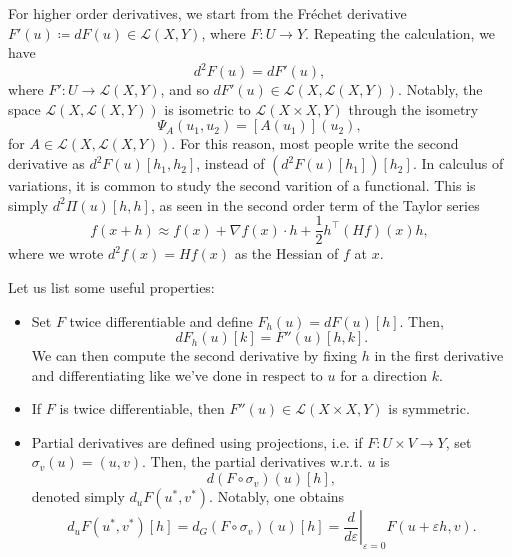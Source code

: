 For higher order derivatives, we start from the Fréchet derivative $F'(u) \coloneqq dF(u)\in \mathcal{L}(X,Y)$, where $F:U\to Y$. Repeating the calculation, we have
\begin{equation*}
    d^2 F(u) = dF'(u), 
\end{equation*} 
where $F': U\to \mathcal{L}(X,Y)$, and so $dF'(u) \in \mathcal{L}(X, \mathcal{L}(X,Y))$. Notably, the space $\mathcal{L}(X, \mathcal{L}(X,Y))$ is isometric to $\mathcal{L}(X\times X,Y)$ through the isometry
\begin{equation*}
    \Psi_A(u_1,u_2) = [A(u_1)](u_2),
\end{equation*} 
for $A\in \mathcal{L}(X,\mathcal{L}(X,Y))$. For this reason, most people write the second derivative as $d^2 F(u) [h_1,h_2]$, instead of $(d^2 F(u)[h_1])[h_2]$. In calculus of variations, it is common to study the second varition of a functional. This is simply $d^2 \Pi(u)[h,h]$, as seen in the second order term of the Taylor series
\begin{equation*}
    f(x+h)\approx f(x) + \nabla f(x) \cdot h + \frac{1}{2} h^\top (Hf)(x) h,
\end{equation*} 
where we wrote $d^2 f(x) = Hf(x)$ as the Hessian of $f$ at $x$.

Let us list some useful properties:
\begin{itemize}
    \item Set $F$ twice differentiable and define $F_h(u)=dF(u)[h]$. Then,
    \begin{equation}\label{eq:second-derivative-property}
        dF_h(u)[k] = F''(u)[h,k]. 
    \end{equation}
    We can then compute the second derivative by fixing $h$ in the first derivative and differentiating like we've done in respect to $u$ for a direction $k$.
    \item If $F$ is twice differentiable, then $F''(u)\in \mathcal{L}(X\times X, Y)$ is symmetric.
    \item Partial derivatives are defined using projections, i.e. if $F: U\times V \to Y$, set $\sigma_v(u)=(u,v)$. Then, the partial derivatives w.r.t. $u$ is
    \begin{equation*}
        d(F\circ \sigma_v)(u)[h],
    \end{equation*}
    denoted simply $d_u F(u^*,v^*)$. Notably, one obtains
    \begin{equation*}
        d_u F(u^*,v^*)[h] = d_G(F\circ \sigma_v)(u)[h] = \left.\frac{d}{d\varepsilon}\right|_{\varepsilon = 0} F(u+\varepsilon h, v).
    \end{equation*}
\end{itemize}

